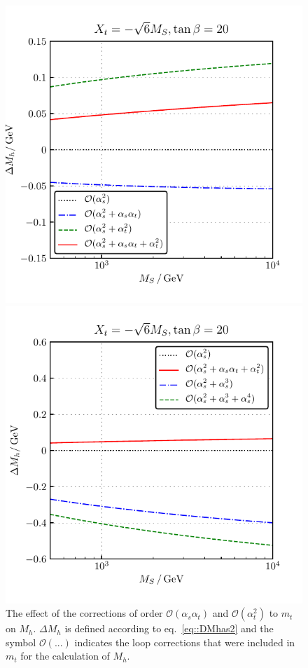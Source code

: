 \documentclass[a4paper,12pt]{book}
\begin{document}
\begin{figure}[h]
\begin{minipage}[t]{0.5\textwidth}
\includegraphics[width=\textwidth]{src/img/DMh_MS_mt2L.pdf}
\captionsetup{width=.8\textwidth}
\caption{The effect of the corrections of order $\mathcal{O}(\alpha_s\alpha_t)$ and $\mathcal{O}(\alpha_t^2)$ to $m_t$ on $M_h$. $\Delta M_h$ is defined according to eq.\ \eqref{eq::DMhas2} and the symbol $\mathcal{O}(...)$ indicates the loop corrections that were included in $m_t$ for the calculation of $M_h$.}
\label{fig::DMh_MS_mt2L}
\end{minipage}
\begin{minipage}[t]{0.5\textwidth}
\includegraphics[width=\textwidth]{src/img/DMh_MS_mt3L4LQCD.pdf}

\end{minipage}
\end{figure}
\end{document}
